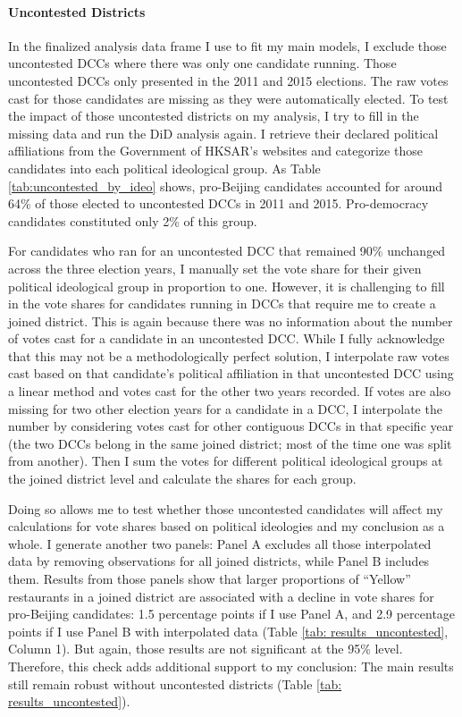 \documentclass[letterpaper, 12pt]{article}
\begin{document}
\paragraph*{Uncontested Districts}
In the finalized analysis data frame I use to fit my main models, I exclude those uncontested DCCs where there was only one candidate running. Those uncontested DCCs only presented in the 2011 and 2015 elections. The raw votes cast for those candidates are missing as they were automatically elected. To test the impact of those uncontested districts on my analysis, I try to fill in the missing data and run the DiD analysis again. I retrieve their declared political affiliations from the Government of HKSAR's websites and categorize those candidates into each political ideological group. As Table \ref{tab:uncontested_by_ideo} shows, pro-Beijing candidates accounted for around 64\% of those elected to uncontested DCCs in 2011 and 2015. Pro-democracy candidates constituted only 2\% of this group. 

For candidates who ran for an uncontested DCC that remained 90\% unchanged across the three election years, I manually set the vote share for their given political ideological group in proportion to one. However, it is challenging to fill in the vote shares for candidates running in DCCs that require me to create a joined district. This is again because there was no information about the number of votes cast for a candidate in an uncontested DCC. While I fully acknowledge that this may not be a methodologically perfect solution, I interpolate raw votes cast based on that candidate's political affiliation in that uncontested DCC using a linear method and votes cast for the other two years recorded. If votes are also missing for two other election years for a candidate in a DCC, I interpolate the number by considering votes cast for other contiguous DCCs in that specific year (the two DCCs belong in the same joined district; most of the time one was split from another). Then I sum the votes for different political ideological groups at the joined district level and calculate the shares for each group. 


Doing so allows me to test whether those uncontested candidates will affect my calculations for vote shares based on political ideologies and my conclusion as a whole. I generate another two panels: Panel A excludes all those interpolated data by removing observations for all joined districts, while Panel B includes them. Results from those panels show that larger proportions of ``Yellow'' restaurants in a joined district are associated with a decline in vote shares for pro-Beijing candidates: 1.5 percentage points if I use Panel A, and 2.9 percentage points if I use Panel B with interpolated data (Table \ref{tab: results_uncontested}, Column 1). But again, those results are not significant at the 95\% level. Therefore, this check adds additional support to my conclusion: The main results still remain robust without uncontested districts (Table \ref{tab: results_uncontested}).
\end{document}
